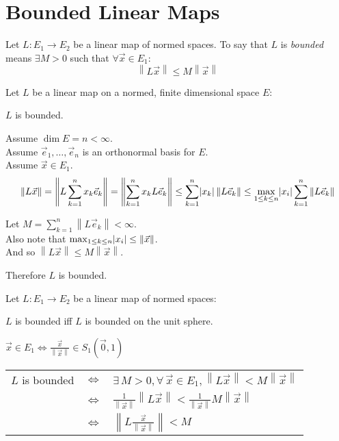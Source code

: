 \documentclass[letterpaper,12pt,fleqn]{article}
\newcommand{\ve}{\vec{e}}
\newcommand{\vx}{\vec{x}}
\newcommand{\vo}{\vec{0}}
\newcommand{\norm}[1]{\left\|#1\right\|}
\begin{document}
\section*{Bounded Linear Maps}

\begin{definition}[Bounded]
  Let $L:E_1\to E_2$ be a linear map of normed spaces. To say that $L$ is
  \emph{bounded} means $\exists M>0$ such that $\forall\vx\in E_1$:
  \[\norm{L\vx}\le M\norm{\vx}\]
\end{definition}

\begin{theorem}
  Let $L$ be a linear map on a normed, finite dimensional space $E$:

  \qquad$L$ is bounded.
\end{theorem}

\begin{theproof}
  Assume $\dim E=n<\infty$. \\
  Assume ${\ve_1,\ldots,\ve_n}$ is an orthonormal basis for $E$. \\
  Assume $\vx\in E_1$.
  \[\norm{L\vx}=\norm{L\sum_{k=1}^nx_k\ve_k}=\norm{\sum_{k=1}^nx_kL\ve_k}\le
  \sum_{k=1}^n\abs{x_k}\norm{L\ve_k}\le
  \max_{1\le k\le n}\abs{x_i}\sum_{k=1}^n\norm{L\ve_k}\]
\end{theproof}
Let $M=\sum_{k=1}^n\norm{L\ve_k}<\infty$. \\
Also note that $\max_{1\le k\le n}\abs{x_i}\le\norm{\vx}$. \\
And so $\norm{L\vx}\le M\norm{\vx}$.

Therefore $L$ is bounded.

\begin{theorem}
  Let $L:E_1\to E_2$ be a linear map of normed spaces:

  \qquad$L$ is bounded iff $L$ is bounded on the unit sphere.
\end{theorem}

\begin{theproof}
  $\vx\in E_1\iff\frac{\vx}{\norm{\vx}}\in S_1(\vo,1)$

  \begin{tabular}{lcl}
    $L$ is bounded & $\iff$ &
    $\exists\,M>0,\forall\,\vx\in E_1,\norm{L\vx}<M\norm{\vx}$ \\
    & $\iff$ &
    $\frac{1}{\norm{\vx}}\norm{L\vx}<\frac{1}{\norm{\vx}}M\norm{\vx}$ \\
    & $\iff$ & $\norm{L\frac{\vx}{\norm{\vx}}}<M$
  \end{tabular}
\end{theproof}
\end{document}
